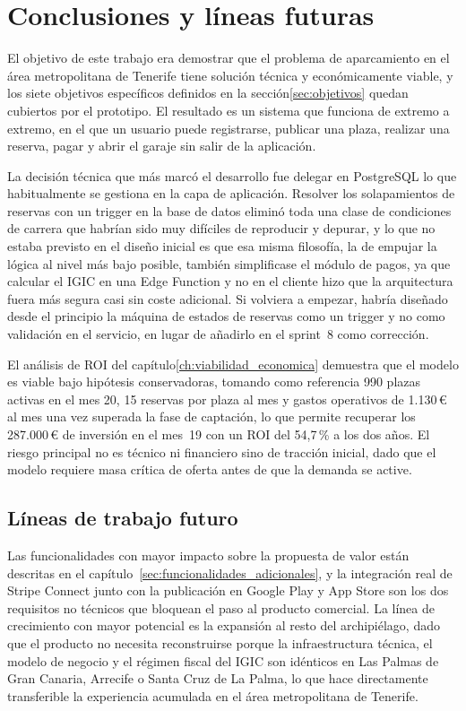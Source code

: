 \chapter{Conclusiones y líneas futuras}
\label{ch:conclusiones}

El objetivo de este trabajo era demostrar que el problema de aparcamiento en el área metropolitana de Tenerife tiene solución técnica y económicamente viable, y los siete objetivos específicos definidos en la sección\ref*{sec:objetivos} quedan cubiertos por el prototipo. El resultado es un sistema que funciona de extremo a extremo, en el que un usuario puede registrarse, publicar una plaza, realizar una reserva, pagar y abrir el garaje sin salir de la aplicación.

La decisión técnica que más marcó el desarrollo fue delegar en PostgreSQL lo que habitualmente se gestiona en la capa de aplicación. Resolver los solapamientos de reservas con un trigger en la base de datos eliminó toda una clase de condiciones de carrera que habrían sido muy difíciles de reproducir y depurar, y lo que no estaba previsto en el diseño inicial es que esa misma filosofía, la de empujar la lógica al nivel más bajo posible, también simplificase el módulo de pagos, ya que calcular el IGIC en una Edge Function y no en el cliente hizo que la arquitectura fuera más segura casi sin coste adicional. Si volviera a empezar, habría diseñado desde el principio la máquina de estados de reservas como un trigger y no como validación en el servicio, en lugar de añadirlo en el sprint~8 como corrección.

El análisis de ROI del capítulo\ref*{ch:viabilidad_economica} demuestra que el modelo es viable bajo hipótesis conservadoras, tomando como referencia 990 plazas activas en el mes 20, 15 reservas por plaza al mes y gastos operativos de 1.130\,€ al mes una vez superada la fase de captación, lo que permite recuperar los 287.000\,€ de inversión en el mes~19 con un ROI del 54,7\,\% a los dos años. El riesgo principal no es técnico ni financiero sino de tracción inicial, dado que el modelo requiere masa crítica de oferta antes de que la demanda se active.

\section{Líneas de trabajo futuro}
\label{sec:lineas_futuras}

Las funcionalidades con mayor impacto sobre la propuesta de valor están descritas en el capítulo~\ref{sec:funcionalidades_adicionales}, y la integración real de Stripe Connect junto con la publicación en Google Play y App Store son los dos requisitos no técnicos que bloquean el paso al producto comercial. La línea de crecimiento con mayor potencial es la expansión al resto del archipiélago, dado que el producto no necesita reconstruirse porque la infraestructura técnica, el modelo de negocio y el régimen fiscal del IGIC son idénticos en Las Palmas de Gran Canaria, Arrecife o Santa Cruz de La Palma, lo que hace directamente transferible la experiencia acumulada en el área metropolitana de Tenerife.
